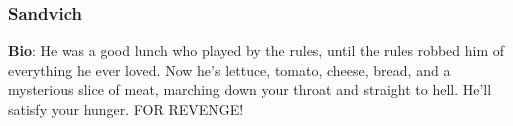 \subsubsection{Sandvich}
{\bf Bio}:
He was a good lunch who played by the rules, until the rules robbed him of everything he ever loved. Now he's lettuce, tomato, cheese, bread, and a mysterious slice of meat, marching down your throat and straight to hell. He'll satisfy your hunger. FOR REVENGE!